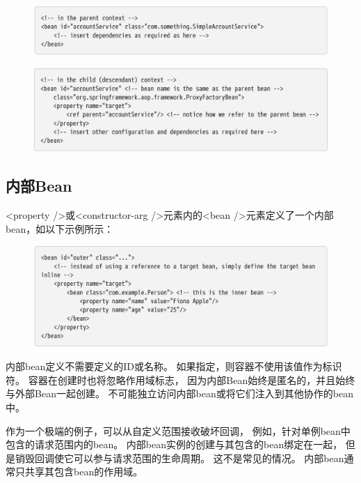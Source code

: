 \begin{figure}[ht]
    \centering
    \includegraphics[width=1\linewidth]{./Figure/IMG_code_38.png}
\end{figure}

\begin{figure}[ht]
    \centering
    \includegraphics[width=1\linewidth]{./Figure/IMG_code_39.png}
\end{figure}

\newpage
\subsection{内部Bean}
<property />或<constructor-arg />元素内的<bean />元素定义了一个内部bean，如以下示例所示：

\begin{figure}[ht]
    \centering
    \includegraphics[width=1\linewidth]{./Figure/IMG_code_40.png}
\end{figure}

内部bean定义不需要定义的ID或名称。
如果指定，则容器不使用该值作为标识符。
容器在创建时也将忽略作用域标志，
因为内部Bean始终是匿名的，并且始终与外部Bean一起创建。
不可能独立访问内部bean或将它们注入到其他协作的bean中。

作为一个极端的例子，可以从自定义范围接收破坏回调，
例如，针对单例bean中包含的请求范围内的bean。 
内部bean实例的创建与其包含的bean绑定在一起，
但是销毁回调使它可以参与请求范围的生命周期。 
这不是常见的情况。 内部bean通常只共享其包含bean的作用域。

